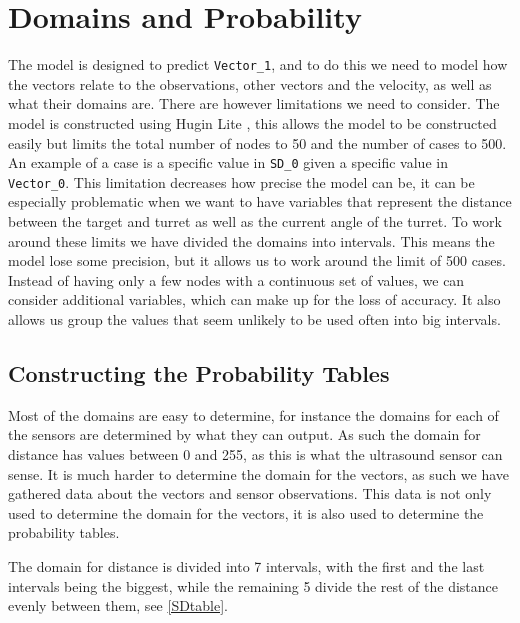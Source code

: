 \section{Domains and Probability}\label{MID}

The model is designed to predict \texttt{Vector\_1}, and to do this we need to
model how the vectors relate to the observations, other vectors and the
velocity, as well as what their domains are. There are however limitations we
need to consider. The model is constructed using Hugin Lite \citep{Hugin}, this
allows the model to be constructed easily but limits the total number of nodes
to 50 and the number of cases to 500. An example of a case is a specific
value in \texttt{SD\_0} given a specific value in \texttt{Vector\_0}. This
limitation decreases how precise the model can be, it can be especially problematic when we want to
have variables that represent the distance between the target and turret as
well as the current angle of the turret. To work around these limits we have
divided the domains into intervals. This means the model lose some precision,
but it allows us to work around the limit of 500 cases. Instead of having
only a few nodes with a continuous set of values, we can consider additional
variables, which can  make up for the loss of accuracy. It also allows us group
the values that seem unlikely to be used often into big intervals.

\subsection{Constructing the Probability Tables}

Most of the domains are easy to determine, for instance the domains for each of
the sensors are determined by what they can output. As such the domain for
distance has values between 0 and 255, as this is what the ultrasound sensor
can sense. It is much harder to determine the domain for the vectors, as such we
have gathered data about the vectors and sensor observations. This data is not
only used to determine the domain for the vectors, it is also used to determine
the probability tables.\nl

The domain for distance is divided into 7 intervals, with the first and the last
intervals being the biggest, while the remaining 5 divide the rest of the
distance evenly between them, see \autoref{SDtable}.

